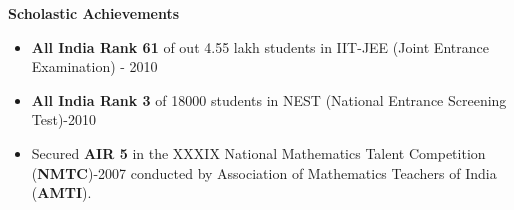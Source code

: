 \documentclass[a4paper,10pt]{article}
\newcommand{\isep}{-2 pt}
\newcommand{\resheading}[1]{{\small \colorbox{mygrey}{\begin{minipage}{0.975\textwidth}{\textbf{#1 \vphantom{p\^{E}}}}\end{minipage}}}}
\begin{document}
\begin{itemize}
\begin{itemize}
	\end{itemize} 
\begin{comment}
\item \textbf{Term paper on Working of a Cordless Telephone} \emph{(Guided by Prof. Vasi J. , EE112 - Spring 2011)\\[-0.7cm]}
	\begin{itemize} \itemsep \isep
	  \item Opened and Analyzed a Cordless phone in a team of 3 members and written a 12-page Term paper with details of working of the phone.
	  \end{itemize}
\end{comment}
\end{itemize}

\resheading{\textbf{\large Scholastic Achievements}}
\begin{itemize}
  \item \textbf{All India Rank 61} of out 4.55 lakh students in IIT-JEE (Joint Entrance Examination) - 2010 \\[-0.7cm]
  
\item \textbf{All India Rank 3} of 18000 students in NEST (National Entrance Screening Test)-2010  \\[-0.7cm]%

  
 \item Secured \textbf{AIR 5} in the  XXXIX National Mathematics Talent Competition (\textbf{NMTC})-2007 conducted by Association of Mathematics Teachers of India (\textbf{AMTI}).\\[-0.7cm]
  \\
\end{itemize}
\end{document}
